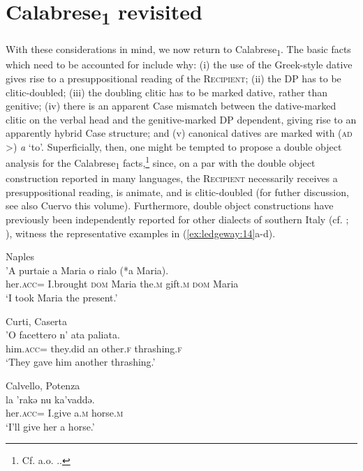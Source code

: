 \documentclass[output=paper,modfonts,nonflat]{langsci/langscibook}
\begin{document}
\section{Calabrese\textsubscript{1} revisited}

With these considerations in mind, we now return to Calabrese\textsubscript{1}. The basic facts which need to be accounted for include why: (i) the use of the Greek-style dative gives rise to a presuppositional reading of the \textsc{Recipient}; (ii) the DP has to be clitic-doubled; (iii) the doubling clitic has to be marked dative, rather than genitive; (iv) there is an apparent Case mismatch between the dative-marked clitic on the verbal head and the genitive-marked DP dependent, giving rise to an apparently hybrid Case structure; and (v) canonical datives are marked with (\textsc{ad} >) \textit{a} ‘to’. Superficially, then, one might be tempted to propose a double object analysis for the Calabrese\textsubscript{1} facts,\footnote{Cf. a.o. \citet{Barss1986,Larson1988, Larson1990,Jackendoff1990,Collins1993,Marantz1993,Demonte1995,Pesetsky1996,Collins1997,Torrego1998,Harley2002,Pylkkanen2008,Anagnostopoulou2003,Cuervo2003,Jeong2007,Bruening2010a, Bruening2010b,Ormazabal2010,Harley2015,Pineda2016}..} since, on a par with the double object construction reported in many languages, the \textsc{Recipient} necessarily receives a presuppositional reading, is animate, and is clitic-doubled (for futher discussion, see also Cuervo this volume). Furthermore, double object constructions have previously been independently reported for other dialects of southern Italy (cf. \citealt[ch.2]{Ledgeway2000}; \citealt[844-847]{Ledgeway2009}), witness the representative examples in (\ref{ex:ledgeway:14}a-d). 

\ea\label{ex:ledgeway:14}
\ea Naples\\

\gll ’A  purtaie  a  Maria  o  rialo  (*a  Maria).\\
    her.\textsc{acc}=  I.brought  \textsc{dom}  Maria  the.\textsc{m}  gift.\textsc{m}    \textsc{dom}  Maria\\
    \glt `I took Maria the present.'

\ex Curti, Caserta\\
    \gll ’O  facettero  n’  ata  paliata.\\
    him.\textsc{acc}=  they.did  an  other.\textsc{f}  thrashing.\textsc{f}\\
    \glt `They gave him another thrashing.'

\ex Calvello, Potenza\\
        \gll la  {}'rakǝ  nu  ka'vaddǝ.\\
    her.\textsc{acc}=  I.give  a.\textsc{m}  horse.\textsc{m}\\
    \glt `I’ll give her a horse.'
\end{document}

